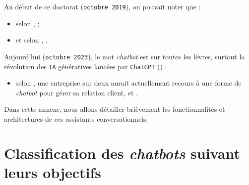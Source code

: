\label{annex:B-ANNEXE-CHATBOT}


Au début de ce doctorat (\texttt{octobre 2019}), on pouvait noter que :
\begin{itemize}
	\item selon \cite{costello-lodolce:2019:gartner-top-technologies},  ;
	\item et selon \cite{goasduff:2019:chatbots-will-appeal}, .
\end{itemize}

Aujourd'hui (\texttt{octobre 2023}), le mot \textit{chatbot} est sur toutes les lèvres, surtout la révolution des \texttt{IA} génératives lancées par \texttt{ChatGPT} (\cite{openai:2023:chatgpt}) :
\begin{itemize}
	\item selon \cite{costello-lodolce:2022:gartner-predicts-chatbots}, une entreprise sur deux aurait actuellement recours à une forme de \textit{chatbot}  pour gérer sa relation client, et .
\end{itemize}

Dans cette annexe, nous allons détailler brièvement les fonctionnalités et architectures de ces assistants conversationnels.

\minitoc

\section{Classification des \textit{chatbots} suivant leurs objectifs}
\label{annex:B.1-CHATBOT-CLASSIFICATION}
	
